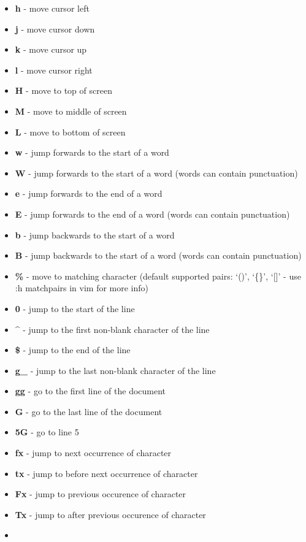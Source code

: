 \documentclass[twocolumn]{article}
\providecommand{\tightlist}{%
  \setlength{\itemsep}{0pt}\setlength{\parskip}{0pt}}
\begin{document}
\begin{itemize}
\tightlist
\item
  \textbf{h} - move cursor left
\item
  \textbf{j} - move cursor down
\item
  \textbf{k} - move cursor up
\item
  \textbf{l} - move cursor right
\item
  \textbf{H} - move to top of screen
\item
  \textbf{M} - move to middle of screen
\item
  \textbf{L} - move to bottom of screen
\item
  \textbf{w} - jump forwards to the start of a word
\item
  \textbf{W} - jump forwards to the start of a word (words can contain
  punctuation)
\item
  \textbf{e} - jump forwards to the end of a word
\item
  \textbf{E} - jump forwards to the end of a word (words can contain
  punctuation)
\item
  \textbf{b} - jump backwards to the start of a word
\item
  \textbf{B} - jump backwards to the start of a word (words can contain
  punctuation)
\item
  \textbf{\%} - move to matching character (default supported pairs:
  `()', `\{\}', `{[}{]}' - use :h matchpairs in vim for more info)
\item
  \textbf{0} - jump to the start of the line
\item
  \textbf{\^{}} - jump to the first non-blank character of the line
\item
  \textbf{\$} - jump to the end of the line
\item
  \textbf{g\_} - jump to the last non-blank character of the line
\item
  \textbf{gg} - go to the first line of the document
\item
  \textbf{G} - go to the last line of the document
\item
  \textbf{5G} - go to line 5
\item
  \textbf{fx} - jump to next occurrence of character
\item
  \textbf{tx} - jump to before next occurrence of character
\item
  \textbf{Fx} - jump to previous occurence of character
\item
  \textbf{Tx} - jump to after previous occurence of character
\item

\end{itemize}
\end{document}

